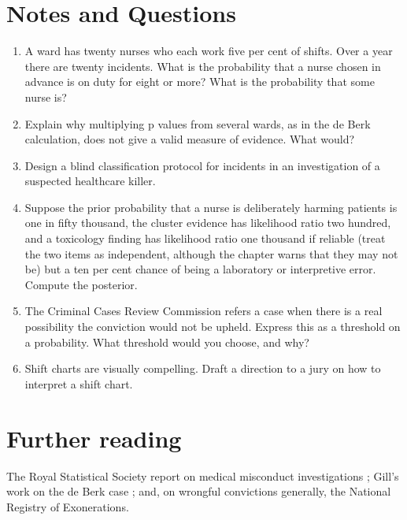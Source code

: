 \section*{Notes and Questions}
\begin{enumerate}[label=\arabic*.]
\item A ward has twenty nurses who each work five per cent of shifts. Over a year there are twenty incidents. What is the probability that a nurse chosen in advance is on duty for eight or more? What is the probability that some nurse is?
\item Explain why multiplying p values from several wards, as in the de Berk calculation, does not give a valid measure of evidence. What would?
\item Design a blind classification protocol for incidents in an investigation of a suspected healthcare killer.
\item Suppose the prior probability that a nurse is deliberately harming patients is one in fifty thousand, the cluster evidence has likelihood ratio two hundred, and a toxicology finding has likelihood ratio one thousand if reliable (treat the two items as independent, although the chapter warns that they may not be) but a ten per cent chance of being a laboratory or interpretive error. Compute the posterior.
\item The Criminal Cases Review Commission refers a case when there is a real possibility the conviction would not be upheld. Express this as a threshold on a probability. What threshold would you choose, and why?
\item Shift charts are visually compelling. Draft a direction to a jury on how to interpret a shift chart.
\end{enumerate}

\section*{Further reading}
The Royal Statistical Society report on medical misconduct investigations \citep{rss2022}; Gill's work on the de Berk case \citep{meester2006,gill2018}; and, on wrongful convictions generally, the National Registry of Exonerations.
